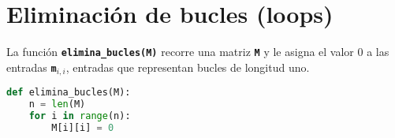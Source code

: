 \section{Eliminación de bucles (loops)}
La función \texttt{\textbf{elimina\_bucles(M)}} recorre una matriz \texttt{\textbf{M}} y le asigna el valor $0$ a las entradas \texttt{\textbf{m$_{i,i}$}}, entradas que representan bucles de longitud uno.
\begin{lstlisting}[language=python, caption=Función elimina\_bucles(M)]
def elimina_bucles(M):
    n = len(M)
    for i in range(n):
        M[i][i] = 0
\end{lstlisting}